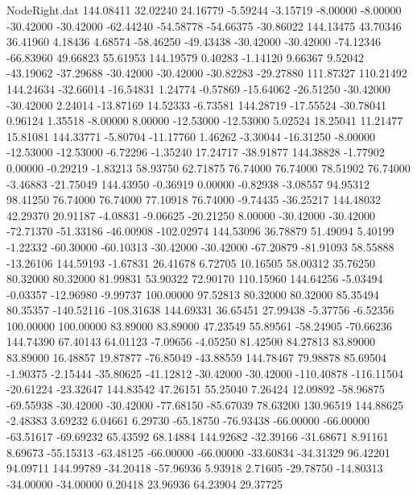 \begin{filecontents}{NodeRight.dat}
 144.08411   32.02240   24.16779    -5.59244   -3.15719   -8.00000   -8.00000  -30.42000  -30.42000  -62.44240  -54.58778  -54.66375  -30.86022
 144.13475   43.70346   36.41960     4.18436    4.68574  -58.46250  -49.43438  -30.42000  -30.42000  -74.12346  -66.83960   49.66823   55.61953
 144.19579    0.40283   -1.14120     9.66367    9.52042  -43.19062  -37.29688  -30.42000  -30.42000  -30.82283  -29.27880  111.87327  110.21492
 144.24634  -32.66014  -16.54831     1.24774   -0.57869  -15.64062  -26.51250  -30.42000  -30.42000    2.24014  -13.87169   14.52333   -6.73581
 144.28719  -17.55524  -30.78041     0.96124    1.35518   -8.00000    8.00000  -12.53000  -12.53000    5.02524   18.25041   11.21477   15.81081
 144.33771   -5.80704  -11.17760     1.46262   -3.30044  -16.31250   -8.00000  -12.53000  -12.53000   -6.72296   -1.35240   17.24717  -38.91877
 144.38828   -1.77902    0.00000    -0.29219   -1.83213   58.93750   62.71875   76.74000   76.74000   78.51902   76.74000   -3.46883  -21.75049
 144.43950   -0.36919    0.00000    -0.82938   -3.08557   94.95312   98.41250   76.74000   76.74000   77.10918   76.74000   -9.74435  -36.25217
 144.48032   42.29370   20.91187    -4.08831   -9.06625  -20.21250    8.00000  -30.42000  -30.42000  -72.71370  -51.33186  -46.00908 -102.02974
 144.53096   36.78879   51.49094     5.40199   -1.22332  -60.30000  -60.10313  -30.42000  -30.42000  -67.20879  -81.91093   58.55888  -13.26106
 144.59193   -1.67831   26.41678     6.72705   10.16505   58.00312   35.76250   80.32000   80.32000   81.99831   53.90322   72.90170  110.15960
 144.64256   -5.03494   -0.03357   -12.96980   -9.99737  100.00000   97.52813   80.32000   80.32000   85.35494   80.35357 -140.52116 -108.31638
 144.69331   36.65451   27.99438    -5.37756   -6.52356  100.00000  100.00000   83.89000   83.89000   47.23549   55.89561  -58.24905  -70.66236
 144.74390   67.40143   64.01123    -7.09656   -4.05250   81.42500   84.27813   83.89000   83.89000   16.48857   19.87877  -76.85049  -43.88559
 144.78467   79.98878   85.69504    -1.90375   -2.15444  -35.80625  -41.12812  -30.42000  -30.42000 -110.40878 -116.11504  -20.61224  -23.32647
 144.83542   47.26151   55.25040     7.26424   12.09892  -58.96875  -69.55938  -30.42000  -30.42000  -77.68150  -85.67039   78.63200  130.96519
 144.88625   -2.48383    3.69232     6.04661    6.29730  -65.18750  -76.93438  -66.00000  -66.00000  -63.51617  -69.69232   65.43592   68.14884
 144.92682  -32.39166  -31.68671     8.91161    8.69673  -55.15313  -63.48125  -66.00000  -66.00000  -33.60834  -34.31329   96.42201   94.09711
 144.99789  -34.20418  -57.96936     5.93918    2.71605  -29.78750  -14.80313  -34.00000  -34.00000    0.20418   23.96936   64.23904   29.37725

\end{filecontents}
